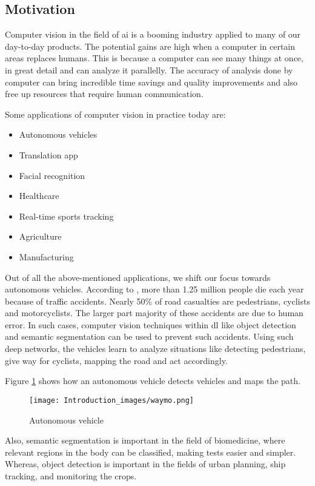 \subsection{Motivation}

Computer vision in the field of \ac{ai} is a booming industry applied to many of our day-to-day products. The potential gains are high when a computer in certain areas replaces humans. This is because a computer can see many things at once, in great detail and can analyze it parallelly. The accuracy of analysis done by computer can bring incredible time savings and quality improvements and also free up resources that require human communication.

\par

Some applications of computer vision in practice today are: 
\begin{itemize}
    \item Autonomous vehicles
    \item Translation app
    \item Facial recognition
    \item Healthcare
    \item Real-time sports tracking
    \item  Agriculture
    \item Manufacturing
\end{itemize}

Out of all the above-mentioned applications, we shift our focus towards autonomous vehicles. According to \cite{WHO}, more than 1.25 million people die each year because of traffic accidents. Nearly 50\% of road casualties are pedestrians, cyclists and motorcyclists. The larger part majority of these accidents are due to human error. In such cases, computer vision techniques within \ac{dl} like object detection and semantic segmentation can be used to prevent such accidents. Using such deep networks, the vehicles learn to analyze situations like detecting pedestrians, give way for cyclists, mapping the road and act accordingly. 
\par
Figure \ref{Waymo} shows how an autonomous vehicle detects vehicles and maps the path.   

\begin{figure}[h!]
    \centering
    \texttt{[image: Introduction\_images/waymo.png]}
    \caption{Autonomous vehicle \cite{Waymo}}
    \label{Waymo}
\end{figure}

Also, semantic segmentation is important in the field of biomedicine, where relevant regions in the body can be classified, making tests easier and simpler. Whereas, object detection is important in the fields of urban planning, ship tracking, and monitoring the crops. 

